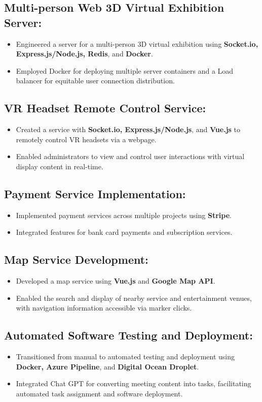 \documentclass{resume}
\begin{document}
\subsection*{Multi-person Web 3D Virtual Exhibition Server:}
\begin{itemize}[noitemsep]
    \item Engineered a server for a multi-person 3D virtual exhibition using \textbf{Socket.io, Express.js/Node.js, Redis}, and \textbf{Docker}.
    \item Employed Docker for deploying multiple server containers and a Load balancer for equitable user connection distribution.
\end{itemize}
\subsection*{VR Headset Remote Control Service:}
\begin{itemize}[noitemsep]
    \item Created a service with \textbf{Socket.io, Express.js/Node.js}, and \textbf{Vue.js} to remotely control VR headsets via a webpage.
    \item Enabled administrators to view and control user interactions with virtual display content in real-time.
\end{itemize}
\subsection*{Payment Service Implementation:}
\begin{itemize}[noitemsep]
    \item Implemented payment services across multiple projects using \textbf{Stripe}.
    \item Integrated features for bank card payments and subscription services.
\end{itemize}
\subsection*{Map Service Development:}
\begin{itemize}[noitemsep]
    \item Developed a map service using \textbf{Vue.js} and \textbf{Google Map API}.
    \item Enabled the search and display of nearby service and entertainment venues, with navigation information accessible via marker clicks.
\end{itemize}
\subsection*{Automated Software Testing and Deployment:}
\begin{itemize}[noitemsep]
    \item Transitioned from manual to automated testing and deployment using \textbf{Docker, Azure Pipeline}, and \textbf{Digital Ocean Droplet}.
    \item Integrated Chat GPT for converting meeting content into tasks, facilitating automated task assignment and software deployment.
\end{itemize}
\end{document}
